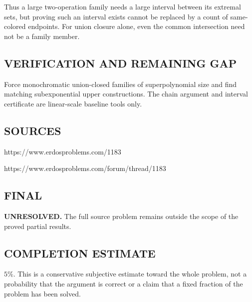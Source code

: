 Thus a large two-operation family needs a large interval between its extremal
sets, but proving such an interval exists cannot be replaced by a count of
same-colored endpoints. For union closure alone, even the common intersection
need not be a family member.

\subsection*{VERIFICATION AND REMAINING GAP}
Force monochromatic union-closed families of superpolynomial size and find
matching subexponential upper constructions. The chain argument and interval
certificate are linear-scale baseline tools only.

\subsection*{SOURCES}
https://www.erdosproblems.com/1183

https://www.erdosproblems.com/forum/thread/1183

\subsection*{FINAL}
\textbf{UNRESOLVED.} The full source problem remains outside the scope of the proved partial results.

\subsection*{COMPLETION ESTIMATE}
$5\%$. This is a conservative subjective estimate toward the whole problem, not a probability that the argument is correct or a claim that a fixed fraction of the problem has been solved.

